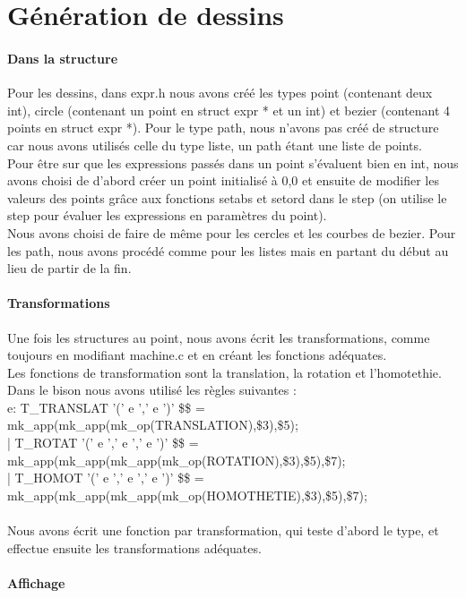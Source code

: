 \documentclass{report}
\begin{document}
\part{Génération de dessins}
\subsection{Dans la structure}

Pour les dessins, dans expr.h nous avons créé les types point (contenant deux int), circle (contenant un point en struct expr * et un int) et bezier (contenant 4 points en struct expr *). Pour le type path, nous n'avons pas créé de structure car nous avons utilisés celle du type liste, un path étant une liste de points.\\
Pour être sur que les expressions passés dans un point s'évaluent bien en int, nous avons choisi de d'abord créer un point initialisé à {0,0} et ensuite de modifier les valeurs des points grâce aux fonctions setabs et setord dans le step (on utilise le step pour évaluer les expressions en paramètres du point).\\
Nous avons choisi de faire de même pour les cercles et les courbes de bezier. Pour les path, nous avons procédé comme pour les listes mais en partant du début au lieu de partir de la fin.

\subsection{Transformations}

Une fois les structures au point, nous avons écrit les transformations, comme toujours en modifiant machine.c et en créant les fonctions adéquates.\\
Les fonctions de transformation sont la translation, la rotation et l'homotethie. Dans le bison nous avons utilisé les règles suivantes :\\
e: T\_TRANSLAT '(' e ',' e ')'    {\$\$ = mk\_app(mk\_app(mk\_op(TRANSLATION),\$3),\$5);}\\
|  T\_ROTAT '(' e ',' e ',' e ')' {\$\$ = mk\_app(mk\_app(mk\_app(mk\_op(ROTATION),\$3),\$5),\$7);}\\
|  T\_HOMOT '(' e ',' e ',' e ')' {\$\$ = mk\_app(mk\_app(mk\_app(mk\_op(HOMOTHETIE),\$3),\$5),\$7);}\\
\\
Nous avons écrit une fonction par transformation, qui teste d'abord le type, et effectue ensuite les transformations adéquates.

\subsection{Affichage}
\end{document}
